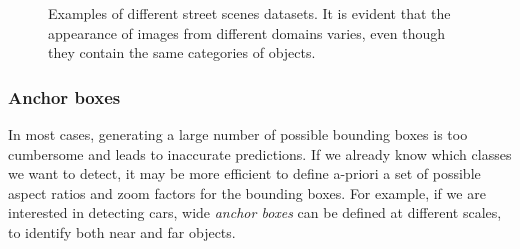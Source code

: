 \documentclass[%
    corpo=12pt,
    twoside,
    stile=classica,   
    tipotesi=magistrale,
    evenboxes,
    english,
	numerazioneromana,
]{toptesi}
\begin{document}
\begin{figure}[p]
	\centering
	\caption{Examples of different street scenes datasets. It is evident that the appearance of images from different domains varies, even though they contain the same categories of objects.}
	\label{fig:datasets}
\end{figure}

\subsubsection{Anchor boxes}\label{sec:anchor}
In most cases, generating a large number of possible bounding boxes is too cumbersome and leads to inaccurate predictions. If we already know which classes we want to detect, it may be more efficient to define a-priori a set of possible aspect ratios and zoom factors for the bounding boxes. For example, if we are interested in detecting cars, wide \textit{anchor boxes} can be defined at different scales, to identify both near and far objects.
\end{document}
